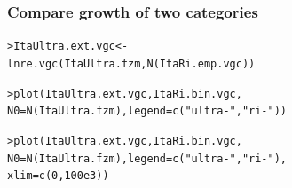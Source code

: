 \documentclass[t]{beamer} %
\begin{document}






















\begin{frame}[fragile]
  \frametitle{Compare growth of two categories}
\begin{alltt}
> ItaUltra.ext.vgc <- 
  lnre.vgc(ItaUltra.fzm, N(ItaRi.emp.vgc))

> plot(ItaUltra.ext.vgc, ItaRi.bin.vgc,
       N0=N(ItaUltra.fzm), legend=c("ultra-", "ri-"))

> plot(ItaUltra.ext.vgc, ItaRi.bin.vgc,
       N0=N(ItaUltra.fzm), legend=c("ultra-", "ri-"),
       xlim=c(0, 100e3))
\end{alltt}
\end{frame}
\end{document}

